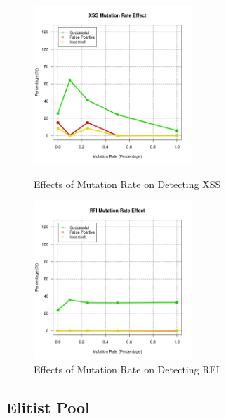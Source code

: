 \begin{appendices}
\begin{figure}[hp]
	\centering
	\includegraphics[height=225px]{./assets/appendix/fullresults/ga/mutation/Results_XSS.png}
	\caption{Effects of Mutation Rate on Detecting XSS}
	\includegraphics[height=225px]{./assets/appendix/fullresults/ga/mutation/Results_RFI.png}
	\caption{Effects of Mutation Rate on Detecting RFI}
\end{figure}

\newpage
\subsection{Elitist Pool} \label{app:resElitist}


\end{appendices}
